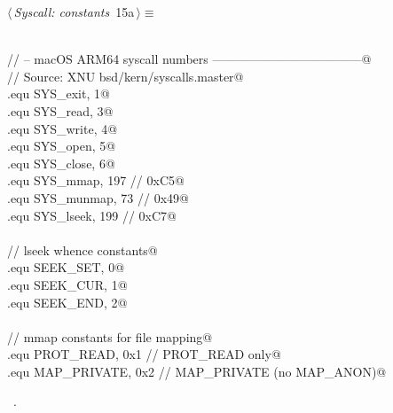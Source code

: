 \documentclass[11pt,a4paper,twoside,openright,DIV=15]{scrbook}
\theoremstyle{definition}
\theoremstyle{plain}
\theoremstyle{remark}
\begin{document}
\begin{flushleft} \small
\begin{minipage}{\linewidth}\label{scrap2}\raggedright\small
{} $\langle\,${\itshape Syscall: constants}\nobreak\ {\footnotesize {15a}}$\,\rangle\equiv$
\vspace{-1ex}
\begin{list}{}{} \item
\mbox{}\verb@@\\
\mbox{}\verb@// -- macOS ARM64 syscall numbers ------------------------------------@\\
\mbox{}\verb@// Source: XNU bsd/kern/syscalls.master@\\
\mbox{}\verb@.equ SYS_exit,     1@\\
\mbox{}\verb@.equ SYS_read,     3@\\
\mbox{}\verb@.equ SYS_write,    4@\\
\mbox{}\verb@.equ SYS_open,     5@\\
\mbox{}\verb@.equ SYS_close,    6@\\
\mbox{}\verb@.equ SYS_mmap,   197          // 0xC5@\\
\mbox{}\verb@.equ SYS_munmap,  73          // 0x49@\\
\mbox{}\verb@.equ SYS_lseek,  199          // 0xC7@\\
\mbox{}\verb@@\\
\mbox{}\verb@// lseek whence constants@\\
\mbox{}\verb@.equ SEEK_SET,     0@\\
\mbox{}\verb@.equ SEEK_CUR,     1@\\
\mbox{}\verb@.equ SEEK_END,     2@\\
\mbox{}\verb@@\\
\mbox{}\verb@// mmap constants for file mapping@\\
\mbox{}\verb@.equ PROT_READ,    0x1       // PROT_READ only@\\
\mbox{}\verb@.equ MAP_PRIVATE,  0x2       // MAP_PRIVATE (no MAP_ANON)@\\
\mbox{}\verb@@{\NWsep}
\end{list}
\vspace{-1.5ex}
\footnotesize
\begin{list}{}{\setlength{\itemsep}{-\parsep}\setlength{\itemindent}{-\leftmargin}}
\item \NWtxtMacroRefIn\ .

\item{}
\end{list}
\end{minipage}\vspace{4ex}
\end{flushleft}
\end{document}
